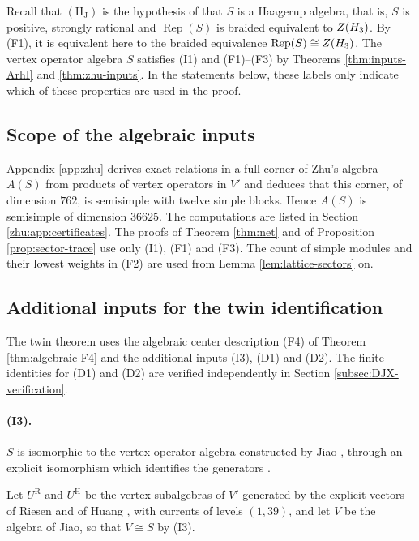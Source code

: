 \documentclass[leqno]{article}
\let\cal\relax
\newcommand{\cal}{\mathcal}
\DeclareMathOperator{\Rep}{Rep}
\numberwithin{equation}{section}
\begin{document}
Recall that $\mathrm{(H_J)}$ is the hypothesis of \cite[Section 1]{Arh26} that $S$ is a Haagerup algebra, that is, $S$ is positive, strongly rational and $\Rep(S)$ is braided equivalent to $Z(\cal H_3)$. By (F1), it is equivalent here to the braided equivalence $\Rep(S) \cong Z(\cal H_3)$. The vertex operator algebra $S$ satisfies (I1) and (F1)--(F3) by Theorems \ref{thm:inputs-ArhI} and \ref{thm:zhu-inputs}. In the statements below, these labels only indicate which of these properties are used in the proof.


\subsection{Scope of the algebraic inputs}
\label{subsec:audit-inputs}

Appendix \ref{app:zhu} derives exact relations in a full corner of Zhu's algebra $A(S)$ from products of vertex operators in $V'$ and deduces that this corner, of dimension $762$, is semisimple with twelve simple blocks. Hence $A(S)$ is semisimple of dimension $36625$. The computations are listed in Section \ref{zhu:app:certificates}. The proofs of Theorem \ref{thm:net} and of Proposition \ref{prop:sector-trace} use only (I1), (F1) and (F3). The count of simple modules and their lowest weights in (F2) are used from Lemma \ref{lem:lattice-sectors} on.

\subsection{Additional inputs for the twin identification}
\label{subsec:twin-inputs}

The twin theorem uses the algebraic center description (F4) of Theorem \ref{thm:algebraic-F4} and the additional inputs (I3), (D1) and (D2). The finite identities for (D1) and (D2) are verified independently in Section \ref{subsec:DJX-verification}.

\paragraph{(I3).} $S$ is isomorphic to the vertex operator algebra constructed by Jiao \cite{Jia26}, through an explicit isomorphism which identifies the generators \cite[Theorem 10.24]{Arh26}.

Let $U^{\mathrm R}$ and $U^{\mathrm H}$ be the vertex subalgebras of $V'$ generated by the explicit vectors of Riesen \cite{Rie26} and of Huang \cite{Hua26}, with currents of levels $(1,39)$, and let $V$ be the algebra of Jiao, so that $V \cong S$ by (I3).
\end{document}
